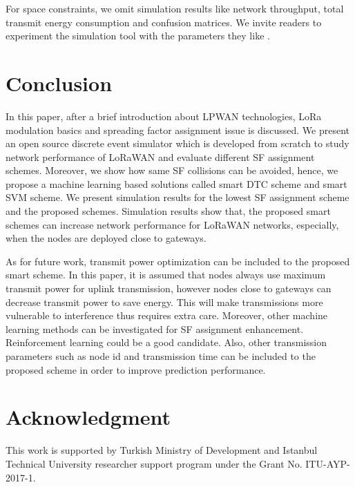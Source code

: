 \documentclass[conference]{IEEEtran}
\begin{document}
For space constraints, we omit simulation results like network throughput, total transmit energy consumption and confusion matrices. We invite readers to experiment the simulation tool with the parameters they like \cite{tugrul_yatagan_2019_2579366}.


\section{Conclusion} \label{Conclusion}
In this paper, after a brief introduction about LPWAN technologies, LoRa modulation basics and spreading factor assignment issue is discussed. We present an open source discrete event simulator which is developed from scratch to study network performance of LoRaWAN and evaluate different SF assignment schemes. Moreover, we show how same SF collisions can be avoided, hence, we propose a machine learning based solutions called smart DTC scheme and smart SVM scheme. We present simulation results for the lowest SF assignment scheme and the proposed schemes. Simulation results show that, the proposed smart schemes can increase network performance for LoRaWAN networks, especially, when the nodes are deployed close to gateways.

As for future work, transmit power optimization can be included to the proposed smart scheme. In this paper, it is assumed that nodes always use maximum transmit power for uplink transmission, however nodes close to gateways can decrease transmit power to save energy. This will make transmissions more vulnerable to interference thus requires extra care. Moreover, other machine learning methods can be investigated for SF assignment enhancement. Reinforcement learning could be a good candidate. Also, other transmission parameters such as node id and transmission time can be included to the proposed scheme in order to improve prediction performance.


\section*{Acknowledgment}
This work is supported by Turkish Ministry of Development and Istanbul Technical University researcher support program under the Grant No. ITU-AYP-2017-1.




\end{document}
